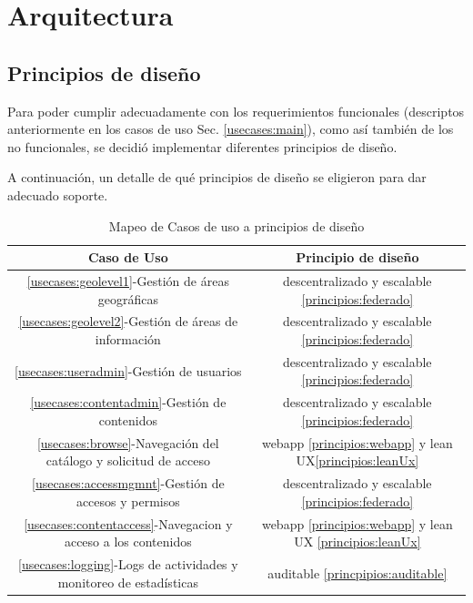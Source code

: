 \chapter{Arquitectura}
\section{Principios de diseño}

Para poder cumplir adecuadamente con los requerimientos funcionales (descriptos anteriormente en los casos de uso Sec. \ref{usecases:main}), como así también de los no funcionales, se decidió implementar diferentes principios de diseño.


A continuación, un detalle de qué principios de diseño se eligieron para dar adecuado soporte.

\begin{table} 
    \centering
    \begin{tabular}{|c|c|}\hline
         \textbf{Caso de Uso}&  \textbf{Principio de diseño}\\\hline
         \ref{usecases:geolevel1}-Gestión de áreas geográficas&  descentralizado y escalable \ref{principios:federado}\\\hline
         \ref{usecases:geolevel2}-Gestión de áreas de información&  descentralizado y escalable \ref{principios:federado}\\\hline
         \ref{usecases:useradmin}-Gestión de usuarios&  descentralizado y escalable \ref{principios:federado}\\\hline
         \ref{usecases:contentadmin}-Gestión de contenidos&  descentralizado y escalable \ref{principios:federado}\\\hline
         \ref{usecases:browse}-Navegación del catálogo y solicitud de acceso&  webapp \ref{principios:webapp} y lean UX\ref{principios:leanUx}\\\hline             
         \ref{usecases:accessmgmnt}-Gestión de accesos y permisos&  descentralizado y escalable \ref{principios:federado}\\\hline 
         \ref{usecases:contentaccess}-Navegacion y acceso a los contenidos&  webapp \ref{principios:webapp} y lean UX \ref{principios:leanUx}\\\hline          
         \ref{usecases:logging}-Logs de actividades y monitoreo de estadísticas& auditable \ref{princpipios:auditable}\\\hline          
    \end{tabular}
    \caption{Mapeo de Casos de uso a principios de diseño}
    \label{tab:usecasesxdesignprinciples}
\end{table}

